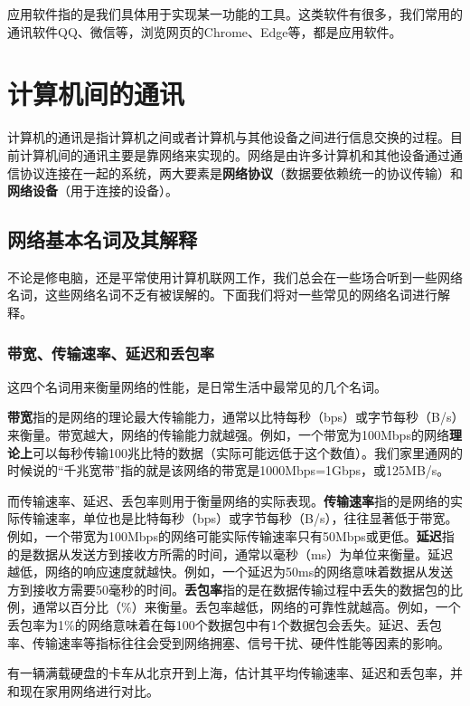 应用软件指的是我们具体用于实现某一功能的工具。这类软件有很多，我们常用的通讯软件QQ、微信等，浏览网页的Chrome、Edge等，都是应用软件。

\section{计算机间的通讯}

计算机的通讯是指计算机之间或者计算机与其他设备之间进行信息交换的过程。目前计算机间的通讯主要是靠网络来实现的。网络是由许多计算机和其他设备通过通信协议连接在一起的系统，两大要素是\textbf{网络协议}（数据要依赖统一的协议传输）和\textbf{网络设备}（用于连接的设备）。

\subsection{网络基本名词及其解释}

不论是修电脑，还是平常使用计算机联网工作，我们总会在一些场合听到一些网络名词，这些网络名词不乏有被误解的。下面我们将对一些常见的网络名词进行解释。

\subsubsection{带宽、传输速率、延迟和丢包率}

这四个名词用来衡量网络的性能，是日常生活中最常见的几个名词。

\textbf{带宽}指的是网络的理论最大传输能力，通常以比特每秒（bps）或字节每秒（B/s）来衡量。带宽越大，网络的传输能力就越强。例如，一个带宽为100Mbps的网络\textbf{理论上}可以每秒传输100兆比特的数据（实际可能远低于这个数值）。我们家里通网的时候说的“千兆宽带”指的就是该网络的带宽是1000Mbps=1Gbps，或125MB/s。

而传输速率、延迟、丢包率则用于衡量网络的实际表现。\textbf{传输速率}指的是网络的实际传输速率，单位也是比特每秒（bps）或字节每秒（B/s），往往显著低于带宽。例如，一个带宽为100Mbps的网络可能实际传输速率只有50Mbps或更低。\textbf{延迟}指的是数据从发送方到接收方所需的时间，通常以毫秒（ms）为单位来衡量。延迟越低，网络的响应速度就越快。例如，一个延迟为50ms的网络意味着数据从发送方到接收方需要50毫秒的时间。\textbf{丢包率}指的是在数据传输过程中丢失的数据包的比例，通常以百分比（\%）来衡量。丢包率越低，网络的可靠性就越高。例如，一个丢包率为1\%的网络意味着在每100个数据包中有1个数据包会丢失。延迟、丢包率、传输速率等指标往往会受到网络拥塞、信号干扰、硬件性能等因素的影响。

\begin{example}
  有一辆满载硬盘的卡车从北京开到上海，估计其平均传输速率、延迟和丢包率，并和现在家用网络进行对比。
\end{example}

